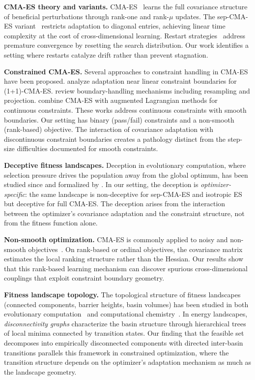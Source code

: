 \documentclass[twoside]{article}
\begin{document}
\textbf{CMA-ES theory and variants.}
CMA-ES~\citep{hansen2001completely} learns the full covariance structure of
beneficial perturbations through rank-one and rank-$\mu$ updates. The
sep-CMA-ES variant~\citep{ros2008simple} restricts adaptation to diagonal
entries, achieving linear time complexity at the cost of cross-dimensional
learning. Restart strategies~\citep{auger2005restart} address premature
convergence by resetting the search distribution. Our work identifies a
setting where restarts catalyze drift rather than prevent stagnation.

\textbf{Constrained CMA-ES.}
Several approaches to constraint handling in CMA-ES have been proposed.
\citet{arnold2012cmaes} analyze adaptation near linear constraint
boundaries for (1+1)-CMA-ES. \citet{kramer2010cmaes} review boundary-handling
mechanisms including resampling and projection. \citet{atamna2016augmented}
combine CMA-ES with augmented Lagrangian methods for continuous constraints.
These works address continuous constraints with smooth boundaries.
Our setting has binary (pass/fail) constraints and a non-smooth (rank-based)
objective. The interaction of covariance adaptation with discontinuous
constraint boundaries creates a pathology distinct from the step-size
difficulties documented for smooth constraints.

\textbf{Deceptive fitness landscapes.}
Deception in evolutionary computation, where selection pressure drives the
population away from the global optimum, has been studied since
\citet{goldberg1987simple} and formalized by \citet{whitley1991fundamental}.
In our setting, the deception is \emph{optimizer-specific}:
the same landscape is non-deceptive for sep-CMA-ES and isotropic ES but
deceptive for full CMA-ES. The deception arises from the interaction between
the optimizer's covariance adaptation and the constraint structure, not from
the fitness function alone.

\textbf{Non-smooth optimization.}
CMA-ES is commonly applied to noisy and non-smooth
objectives~\citep{hansen2009benchmarking}. On rank-based or ordinal objectives,
the covariance matrix estimates the local ranking structure rather than the
Hessian. Our results show that this rank-based learning mechanism can discover
spurious cross-dimensional couplings that exploit constraint boundary
geometry.

\textbf{Fitness landscape topology.}
The topological structure of fitness landscapes (connected components,
barrier heights, basin volumes) has been studied in both
evolutionary computation~\citep{reidys2002combinatorial} and computational
chemistry~\citep{wales2003energy,becker1997topology}. In energy landscapes,
\emph{disconnectivity graphs} characterize the basin structure through
hierarchical trees of local minima connected by transition states. Our
finding that the feasible set decomposes into empirically disconnected
components with directed inter-basin transitions parallels this framework
in constrained optimization, where the transition structure depends on the
optimizer's adaptation mechanism as much as the landscape geometry.
\end{document}
